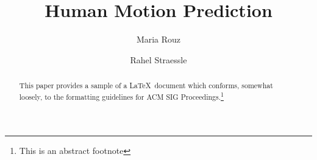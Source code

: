 \documentclass[sigconf]{acmart}
\begin{document}
\title{Human Motion Prediction}

\author{Maria Rouz}\affiliation{}

\author{Rahel Straessle}\affiliation{}

\begin{abstract}
This paper provides a sample of a \LaTeX\ document which conforms,
somewhat loosely, to the formatting guidelines for
ACM SIG Proceedings.\footnote{This is an abstract footnote}
\end{abstract}

\maketitle





\end{document}

